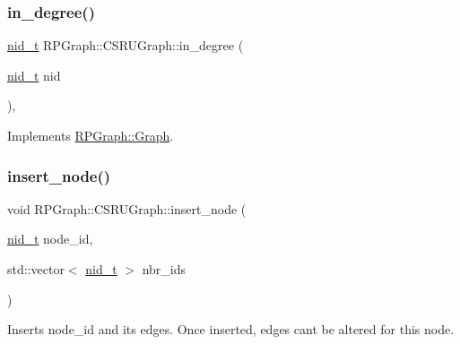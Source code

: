 \mbox{\label{classRPGraph_1_1CSRUGraph_a88965d72f2fbea43b6d731d2cc027858}} 
\subsubsection{\texorpdfstring{in\+\_\+degree()}{in\_degree()}}
{\footnotesize\ttfamily \mbox{\hyperlink{namespaceRPGraph_ab3ae34f1ab88e48f43794c30c8697b74}{nid\+\_\+t}} R\+P\+Graph\+::\+C\+S\+R\+U\+Graph\+::in\+\_\+degree (\begin{DoxyParamCaption}\item[{\mbox{\hyperlink{namespaceRPGraph_ab3ae34f1ab88e48f43794c30c8697b74}{nid\+\_\+t}}}]{nid }\end{DoxyParamCaption})\hspace{0.3cm}{\ttfamily [override]}, {\ttfamily [virtual]}}



Implements \mbox{\hyperlink{classRPGraph_1_1Graph_ab75e19f698a4ab99e37593c7178f2c1a}{R\+P\+Graph\+::\+Graph}}.

\mbox{\label{classRPGraph_1_1CSRUGraph_a8d9cba867ebb6116cb391b78ad7ae31e}} 
\subsubsection{\texorpdfstring{insert\+\_\+node()}{insert\_node()}}
{\footnotesize\ttfamily void R\+P\+Graph\+::\+C\+S\+R\+U\+Graph\+::insert\+\_\+node (\begin{DoxyParamCaption}\item[{\mbox{\hyperlink{namespaceRPGraph_ab3ae34f1ab88e48f43794c30c8697b74}{nid\+\_\+t}}}]{node\+\_\+id,  }\item[{std\+::vector$<$ \mbox{\hyperlink{namespaceRPGraph_ab3ae34f1ab88e48f43794c30c8697b74}{nid\+\_\+t}} $>$}]{nbr\+\_\+ids }\end{DoxyParamCaption})}

Inserts node\+\_\+id and its edges. Once inserted, edges can\textquotesingle{}t be altered for this node. \mbox{\label{classRPGraph_1_1CSRUGraph_a17284d198dac4fb4611ffda71c679471}} 

